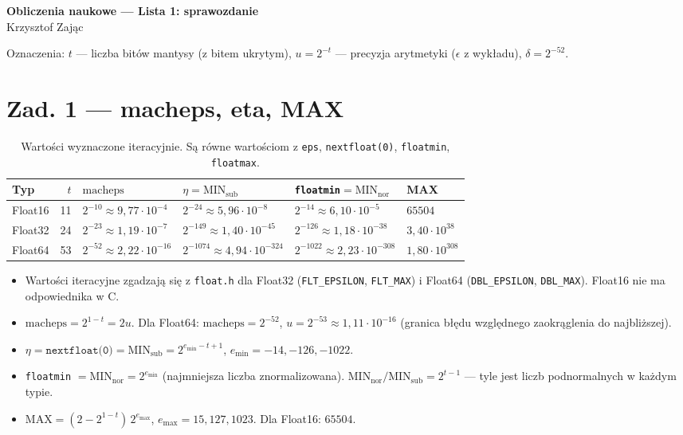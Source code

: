 \documentclass[10pt,a4paper]{article}
\title{}
\newcommand{\macheps}{\mathrm{macheps}}
\newcommand{\MINsub}{\mathrm{MIN_{sub}}}
\newcommand{\MINnor}{\mathrm{MIN_{nor}}}
\begin{document}
\begin{center}
{\Large\bfseries Obliczenia naukowe --- Lista 1: sprawozdanie}\\[3pt]
Krzysztof Zając
\end{center}

Oznaczenia: $t$ --- liczba bitów mantysy (z bitem ukrytym), $u=2^{-t}$ --- precyzja arytmetyki ($\epsilon$ z wykładu), $\delta=2^{-52}$.

\section*{Zad. 1 --- macheps, eta, MAX}

\begin{table}[!htbp]
\centering\small
\setlength{\tabcolsep}{4pt}
\begin{tabular}{lrllll}
\toprule
Typ & $t$ & $\macheps$ & $\eta=\MINsub$ & \texttt{floatmin}$=\MINnor$ & MAX \\
\midrule
Float16 & 11 & $2^{-10}\approx 9{,}77\cdot10^{-4}$ & $2^{-24}\approx 5{,}96\cdot10^{-8}$ & $2^{-14}\approx 6{,}10\cdot10^{-5}$ & $65504$ \\
Float32 & 24 & $2^{-23}\approx 1{,}19\cdot10^{-7}$ & $2^{-149}\approx 1{,}40\cdot10^{-45}$ & $2^{-126}\approx 1{,}18\cdot10^{-38}$ & $3{,}40\cdot10^{38}$ \\
Float64 & 53 & $2^{-52}\approx 2{,}22\cdot10^{-16}$ & $2^{-1074}\approx 4{,}94\cdot10^{-324}$ & $2^{-1022}\approx 2{,}23\cdot10^{-308}$ & $1{,}80\cdot10^{308}$ \\
\bottomrule
\end{tabular}
\caption{Wartości wyznaczone iteracyjnie. Są równe wartościom z \texttt{eps}, \texttt{nextfloat(0)}, \texttt{floatmin}, \texttt{floatmax}.}
\end{table}

\begin{itemize}
\item Wartości iteracyjne zgadzają się z \texttt{float.h} dla Float32 (\texttt{FLT\_EPSILON}, \texttt{FLT\_MAX}) i Float64 (\texttt{DBL\_EPSILON}, \texttt{DBL\_MAX}). Float16 nie ma odpowiednika w C.
\item $\macheps=2^{1-t}=2u$. Dla Float64: $\macheps=2^{-52}$, $u=2^{-53}\approx1{,}11\cdot10^{-16}$ (granica błędu względnego zaokrąglenia do najbliższej).
\item $\eta=\texttt{nextfloat(0)}=\MINsub=2^{e_{\min}-t+1}$, $e_{\min}=-14,-126,-1022$.
\item \texttt{floatmin} $=\MINnor=2^{e_{\min}}$ (najmniejsza liczba znormalizowana). $\MINnor/\MINsub=2^{t-1}$ --- tyle jest liczb podnormalnych w każdym typie.
\item $\mathrm{MAX}=(2-2^{1-t})\,2^{e_{\max}}$, $e_{\max}=15,127,1023$. Dla Float16: $65504$.
\end{itemize}
\end{document}
